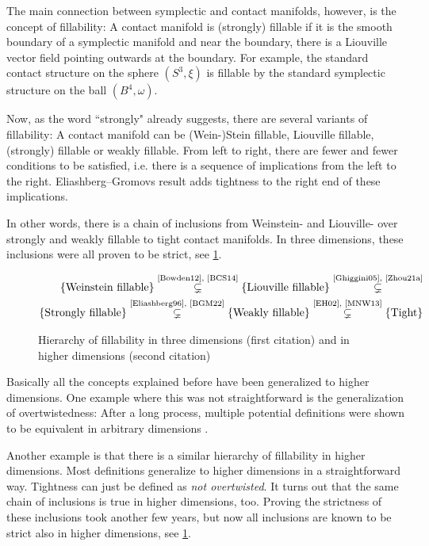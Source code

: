 The main connection between symplectic and contact manifolds, however, is the concept of fillability:
A contact manifold is (strongly) fillable if it is the smooth boundary of a symplectic manifold and
near the boundary, there is a Liouville vector field pointing outwards at the boundary.
For example, the standard contact structure on the sphere $(S^3, \xi)$ is fillable
by the standard symplectic structure on the ball $(B^4, \omega)$.

Now, as the word ``strongly" already suggests, there are several variants of fillability:
A contact manifold can be (Wein-)Stein fillable, Liouville fillable, (strongly) fillable or weakly fillable.
From left to right, there are fewer and fewer conditions to be satisfied, i.e. there is a sequence
of implications from the left to the right. 
Eliashberg--Gromovs result adds tightness to the right end of these implications.

In other words, there is a chain of inclusions from 
Weinstein- and Liouville- over strongly and weakly fillable to tight contact manifolds.
In three dimensions, these inclusions were all proven to be strict, see \cref{fig:fillability}.
\begin{figure}
    \begin{align*}
        \{\text{Weinstein fillable}\} \stackrel{\text{\cite{Bowden12}, \cite{BCS14}}}{\subsetneq} 
        \{\text{Liouville fillable}\} \stackrel{\text{\cite{Ghiggini05}, \cite{Zhou21a}}}{\subsetneq}\\
        \{\text{Strongly  fillable}\} \stackrel{\text{\cite{Eliashberg96}, \cite{BGM22}}}{\subsetneq}
        \{\text{Weakly    fillable}\} \stackrel{\text{\cite{EH02}, \cite{MNW13}}}{\subsetneq}
        \{\text{Tight}\}
    \end{align*}
    \caption{Hierarchy of fillability in three dimensions (first citation) and in higher dimensions (second citation)}
    \label{fig:fillability}
\end{figure}

Basically all the concepts explained before have been generalized to higher dimensions.
One example where this was not straightforward is the generalization of overtwistedness: 
After a long process, multiple potential definitions were shown to be equivalent in arbitrary dimensions \cite{BEM15,CMP19,Huang17}.

Another example is that there is a similar hierarchy of fillability in higher dimensions. 
Most definitions generalize to higher dimensions in a straightforward way. Tightness can just be defined as \textit{not overtwisted}.
It turns out that the same chain of inclusions is true in higher dimensions, too.
Proving the strictness of these inclusions took another few years, but now all inclusions are known to be strict also in higher dimensions, 
see \cref{fig:fillability}.

